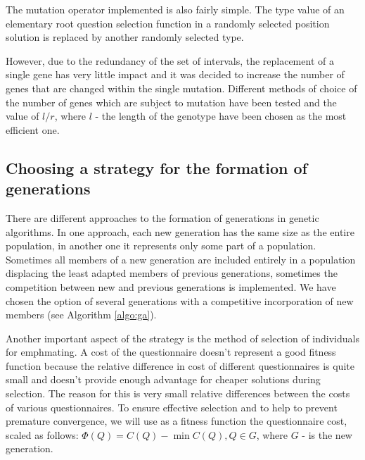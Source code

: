 \documentclass[11pt]{article}
\begin{document}
The mutation operator implemented is also fairly simple. The type value of an elementary root question selection function in a randomly selected position solution is replaced by another randomly selected type. 

However, due to the redundancy of the set of intervals, the replacement of a single gene has very little impact and it was decided to increase the number of genes that are changed within the single mutation. Different methods of choice of the number of genes which are subject to mutation have been tested and the value of $l/r$, where $l$ - the length of the genotype have been chosen as the most efficient one. 

%
%
%
\subsection{Choosing a strategy for the formation of generations}
There are different approaches to the formation of generations in genetic algorithms. In one approach, each new generation has the same size as the entire population, in another one it represents only some part of a population. Sometimes all members of a new generation are included entirely in a population displacing the least adapted members of previous generations, sometimes the competition between new and previous generations is implemented. We have chosen the option of several generations with a competitive incorporation of new members (see Algorithm \ref{algo:ga}).

Another important aspect of the strategy is the method of selection of individuals for emph{mating}. A cost of the questionnaire doesn't represent a good fitness function because the relative difference in cost of different questionnaires is quite small and doesn't provide enough advantage for cheaper solutions during selection. The reason for this is very small relative differences between the costs of various questionnaires. To ensure effective selection and to help to prevent premature convergence, we will use as a fitness function the questionnaire cost, scaled as follows: $\Phi(Q)=C(Q)-\min C(Q), Q\in G$, where $G$ - is the new generation. 

%
%
%
\end{document}
